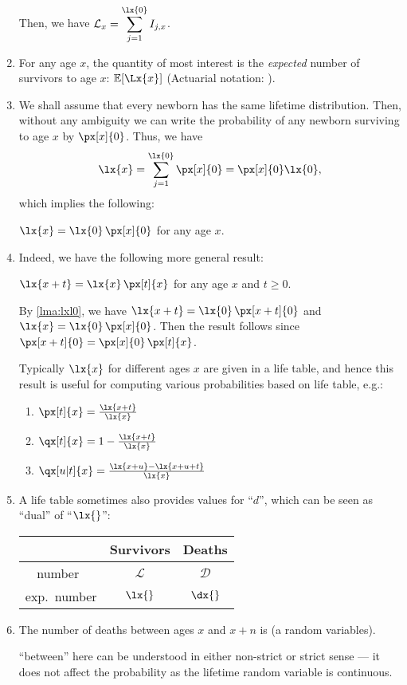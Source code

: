 \begin{enumerate}
Then, we have \(\displaystyle\mathcal{L}_{x}=\sum_{j=1}^{\lx{0}}I_{j,x}\).
\item For any age \(x\), the quantity of most interest is the \emph{expected}
number of survivors to age \(x\): \(\expv{\Lx{x}}\) (Actuarial notation:
).
\item We shall assume that every newborn has the same lifetime distribution.
Then, without any ambiguity we can write the probability of any newborn
surviving to age \(x\) by \(\px[x]{0}\). Thus, we have
\[
\lx{x}=\sum_{j=1}^{\lx{0}}\px[x]{0}=\px[x]{0}\lx{0},
\]
which implies the following:
\begin{lemma}
\label{lma:lxl0}
\(\lx{x}=\lx{0}\,\px[x]{0}\) for any age \(x\).
\end{lemma}

\item Indeed, we have the following more general result:
\begin{proposition}
\label{prp:lxpx}
\(\lx{x+t}=\lx{x}\,\px[t]{x}\) for any age \(x\) and \(t\ge 0\).
\end{proposition}
\begin{pf}
By \cref{lma:lxl0}, we have \(\lx{x+t}=\lx{0}\,\px[x+t]{0}\) and
\(\lx{x}=\lx{0}\,\px[x]{0}\). Then the result follows since
\(\px[x+t]{0}=\px[x]{0}\,\px[t]{x}\).
\end{pf}

Typically \(\lx{x}\) for different ages \(x\) are given in a life table, and
hence this result is useful for computing various probabilities based on life
table, e.g.:
\begin{enumerate}
\item \(\px[t]{x}=\frac{\lx{x+t}}{\lx{x}}\)
\item \(\qx[t]{x}=1-\frac{\lx{x+t}}{\lx{x}}\)
\item \(\qx[u|t]{x}=\frac{\lx{x+u}-\lx{x+u+t}}{\lx{x}}\)
\end{enumerate}

\item A life table sometimes also provides values for ``\(d\)'', which can be
seen as ``dual'' of ``\(\lx{}\)'':
\begin{center}
\begin{tabular}{ccc}
&Survivors&Deaths\\
\hline
number\ &\(\mathcal{L}\)&\(\mathcal{D}\)\\
exp.\ number &\(\lx{}\)&\(\dx{}\)\\
\end{tabular}
\end{center}
\item The number of deaths between ages \(x\) and \(x+n\) is
 (a random variables).
\begin{note}
``between'' here can be understood in either non-strict or strict sense --- it
does not affect the probability as the lifetime random variable is continuous.
\end{note}


\end{enumerate}
